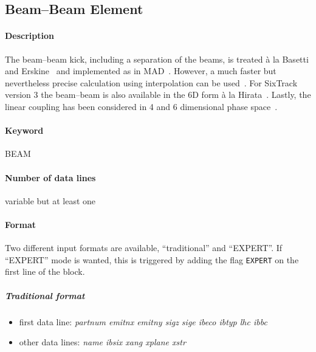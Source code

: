 \documentclass[a4paper,11pt]{report}
\begin{document}
\subsection{Beam--Beam Element}
\label{BeamBeam}

\paragraph{Description} The beam--beam kick, including a separation of the beams, is treated \`{a} la Basetti and Erskine~\cite{BasErs} and implemented as in MAD~\cite{MAD}.
However, a much faster but nevertheless precise calculation using interpolation can be used~\cite{ERIC}.
For SixTrack version 3 the beam--beam is also available in the 6D form \`{a} la Hirata~\cite{Hirata}.
Lastly, the linear coupling has been considered in 4 and 6 dimensional phase space~\cite{ripbeam}. 

\paragraph{Keyword} BEAM
\paragraph{Number of data lines} variable but at least one

\paragraph{Format}
Two different input formats are available, ``traditional'' and ``EXPERT''.
If ``EXPERT'' mode is wanted, this is triggered by adding the flag \texttt{EXPERT} on the first line of the block.

\subparagraph{Traditional format}

\begin{itemize}
\item first data line: {\em partnum emitnx emitny sigz sige ibeco
    ibtyp lhc ibbc} 
\item other data lines: {\em name ibsix xang xplane xstr}
\end{itemize}
\end{document}
